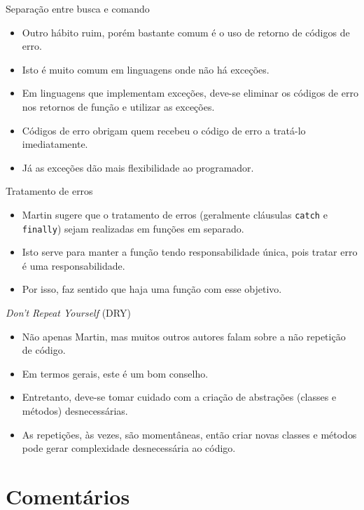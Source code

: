 \documentclass[11pt]{beamer}
\begin{document}
  \begin{frame}{Separação entre busca e comando}
    \begin{itemize}
      \item Outro hábito ruim, porém bastante comum é o uso de retorno de códigos de erro.
      \item Isto é muito comum em linguagens onde não há exceções.
      \item Em linguagens que implementam exceções, deve-se eliminar os códigos de erro nos retornos de função e utilizar as exceções.
      \item Códigos de erro obrigam quem recebeu o código de erro a tratá-lo imediatamente.
      \item Já as exceções dão mais flexibilidade ao programador.
    \end{itemize}
  \end{frame}

  \begin{frame}[fragile]{Tratamento de erros}
    \begin{itemize}
      \item Martin sugere que o tratamento de erros (geralmente cláusulas \verb|catch| e \verb|finally|) sejam realizadas em funções em separado.
      \item Isto serve para manter a função tendo responsabilidade única, pois tratar erro é uma responsabilidade.
      \item Por isso, faz sentido que haja uma função com esse objetivo.
    \end{itemize}
  \end{frame}

  \begin{frame}{\textit{Don't Repeat Yourself} (DRY)}
    \begin{itemize}
      \item Não apenas Martin, mas muitos outros autores falam sobre a não repetição de código.
      \item Em termos gerais, este é um bom conselho.
      \item Entretanto, deve-se tomar cuidado com a criação de abstrações (classes e métodos) desnecessárias.
      \item As repetições, às vezes, são momentâneas, então criar novas classes e métodos pode gerar complexidade desnecessária ao código. 
    \end{itemize}
  \end{frame}

  \section{Comentários}
\end{document}
